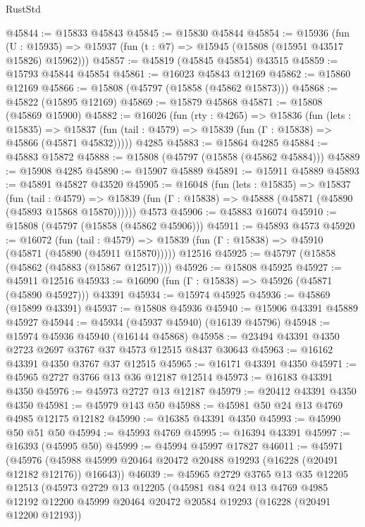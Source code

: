 \begin{lexlean}{RustStd}
\begin{coremodule}
@45844 := @15833 @45843
@45845 := @15830 @45844
@45854 := @15936
    (fun (U : @15935) => @15937 (fun (t : @7) => @15945 (@15808 (@15951 @43517 @15826) @15962)))
@45857 := @45819 (@45845 @45854) @43515
@45859 := @15793 @45844 @45854
@45861 := @16023 @45843 @12169
@45862 := @15860 @12169
@45866 := @15808 (@45797 (@15858 (@45862 @15873)))
@45868 := @45822 (@15895 @12169)
@45869 := @15879 @45868
@45871 := @15808 (@45869 @15900)
@45882 := @16026
    (fun (rty : @4265) =>
    @15836
      (fun (lets : @15835) =>
      @15837 (fun (tail : @4579) => @15839 (fun (Γ : @15838) => @45866 (@45871 @45832)))))
    @4285
@45883 := @15864 @4285
@45884 := @45883 @15872
@45888 := @15808 (@45797 (@15858 (@45862 @45884)))
@45889 := @15908 @4285
@45890 := @15907 @45889
@45891 := @15911 @45889
@45893 := @45891 @45827 @43520
@45905 := @16048
    (fun (lets : @15835) =>
    @15837
      (fun (tail : @4579) =>
      @15839 (fun (Γ : @15838) => @45888 (@45871 (@45890 (@45893 @15868 @15870))))))
    @4573
@45906 := @45883 @16074
@45910 := @15808 (@45797 (@15858 (@45862 @45906)))
@45911 := @45893 @4573
@45920 := @16072
    (fun (tail : @4579) => @15839 (fun (Γ : @15838) => @45910 (@45871 (@45890 (@45911 @15870)))))
    @12516
@45925 := @45797 (@15858 (@45862 (@45883 (@15867 @12517))))
@45926 := @15808 @45925
@45927 := @45911 @12516
@45933 := @16090 (fun (Γ : @15838) => @45926 (@45871 (@45890 @45927))) @43391
@45934 := @15974 @45925
@45936 := @45869 (@15899 @43391)
@45937 := @15808 @45936
@45940 := @15906 @43391 @45889 @45927
@45944 := @45934 (@45937 @45940) (@16139 @45796)
@45948 := @15974 @45936 @45940 (@16144 @45868)
@45958 := @23494 @43391 @4350 @2723 @2697 @3767 @37 @4573 @12515 @8437 @30643
@45963 := @16162 @43391 @4350 @3767 @37 @12515
@45965 := @16171 @43391 @4350
@45971 := @45965 @2727 @3766 @13 @36 @12187 @12514
@45973 := @16183 @43391 @4350
@45976 := @45973 @2727 @13 @12187
@45979 := @20412 @43391 @4350 @4350
@45981 := @45979 @143 @50
@45988 := @45981 @50 @24 @13 @4769 @4985 @12175 @12182
@45990 := @16385 @43391 @4350
@45993 := @45990 @50 @51 @50
@45994 := @45993 @4769
@45995 := @16394 @43391
@45997 := @16393 (@45995 @50)
@45999 := @45994 @45997 @17827
@46011 := @45971
    (@45976 (@45988 @45999 @20464 @20472 @20488 @19293 (@16228 (@20491 @12182 @12176)) @16643))
@46039 := @45965
    @2729
    @3765
    @13
    @35
    @12205
    @12513
    (@45973
      @2729
      @13
      @12205
      (@45981
        @84
        @24
        @13
        @4769
        @4985
        @12192
        @12200
        @45999
        @20464
        @20472
        @20584
        @19293
        (@16228 (@20491 @12200 @12193))

\end{coremodule}
\end{lexlean}
